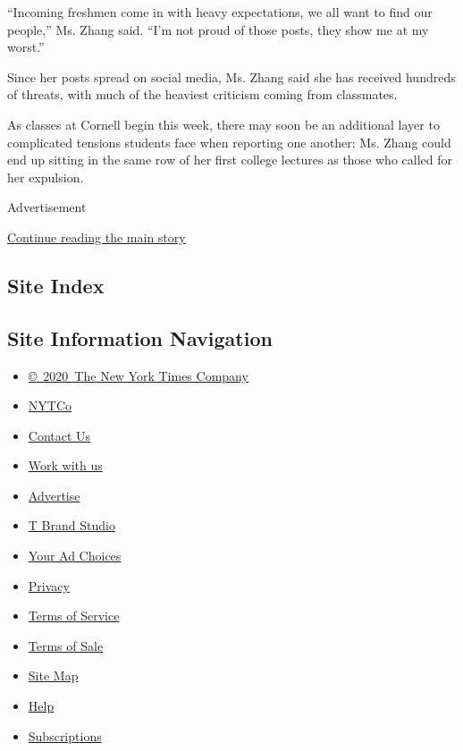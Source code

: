 ``Incoming freshmen come in with heavy expectations, we all want to find
our people,'' Ms. Zhang said. ``I'm not proud of those posts, they show
me at my worst.''

Since her posts spread on social media, Ms. Zhang said she has received
hundreds of threats, with much of the heaviest criticism coming from
classmates.

As classes at Cornell begin this week, there may soon be an additional
layer to complicated tensions students face when reporting one another:
Ms. Zhang could end up sitting in the same row of her first college
lectures as those who called for her expulsion.

Advertisement

\protect\hyperlink{after-bottom}{Continue reading the main story}

\hypertarget{site-index}{%
\subsection{Site Index}\label{site-index}}

\hypertarget{site-information-navigation}{%
\subsection{Site Information
Navigation}\label{site-information-navigation}}

\begin{itemize}
\tightlist
\item
  \href{https://help.nytimes3xbfgragh.onion/hc/en-us/articles/115014792127-Copyright-notice}{©~2020~The
  New York Times Company}
\end{itemize}

\begin{itemize}
\tightlist
\item
  \href{https://www.nytco.com/}{NYTCo}
\item
  \href{https://help.nytimes3xbfgragh.onion/hc/en-us/articles/115015385887-Contact-Us}{Contact
  Us}
\item
  \href{https://www.nytco.com/careers/}{Work with us}
\item
  \href{https://nytmediakit.com/}{Advertise}
\item
  \href{http://www.tbrandstudio.com/}{T Brand Studio}
\item
  \href{https://www.nytimes3xbfgragh.onion/privacy/cookie-policy\#how-do-i-manage-trackers}{Your
  Ad Choices}
\item
  \href{https://www.nytimes3xbfgragh.onion/privacy}{Privacy}
\item
  \href{https://help.nytimes3xbfgragh.onion/hc/en-us/articles/115014893428-Terms-of-service}{Terms
  of Service}
\item
  \href{https://help.nytimes3xbfgragh.onion/hc/en-us/articles/115014893968-Terms-of-sale}{Terms
  of Sale}
\item
  \href{https://spiderbites.nytimes3xbfgragh.onion}{Site Map}
\item
  \href{https://help.nytimes3xbfgragh.onion/hc/en-us}{Help}
\item
  \href{https://www.nytimes3xbfgragh.onion/subscription?campaignId=37WXW}{Subscriptions}
\end{itemize}
